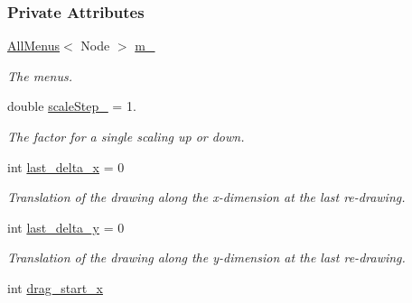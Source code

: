 \subsubsection*{Private Attributes}
\begin{DoxyCompactItemize}
\item 
\hyperlink{structAllMenus}{All\+Menus}$<$ Node $>$ \hyperlink{structui_1_1Visualizer_a13941bcce1ee1312a18bd174f7815f2f}{m\+\_\+}\hypertarget{structui_1_1Visualizer_a13941bcce1ee1312a18bd174f7815f2f}{}\label{structui_1_1Visualizer_a13941bcce1ee1312a18bd174f7815f2f}

\begin{DoxyCompactList}\small\item\em The menus. \end{DoxyCompactList}\item 
double \hyperlink{structui_1_1Visualizer_aaedb6cde16ff115fd44cdd79153405c1}{scale\+Step\+\_\+} = 1.\hypertarget{structui_1_1Visualizer_aaedb6cde16ff115fd44cdd79153405c1}{}\label{structui_1_1Visualizer_aaedb6cde16ff115fd44cdd79153405c1}

\begin{DoxyCompactList}\small\item\em The factor for a single scaling up or down. \end{DoxyCompactList}\item 
int \hyperlink{structui_1_1Visualizer_a74637d45384e77e4426d0075290788c8}{last\+\_\+delta\+\_\+x} = 0\hypertarget{structui_1_1Visualizer_a74637d45384e77e4426d0075290788c8}{}\label{structui_1_1Visualizer_a74637d45384e77e4426d0075290788c8}

\begin{DoxyCompactList}\small\item\em Translation of the drawing along the x-\/dimension at the last re-\/drawing. \end{DoxyCompactList}\item 
int \hyperlink{structui_1_1Visualizer_abd1d1f57da08d52f9da93971017df29d}{last\+\_\+delta\+\_\+y} = 0\hypertarget{structui_1_1Visualizer_abd1d1f57da08d52f9da93971017df29d}{}\label{structui_1_1Visualizer_abd1d1f57da08d52f9da93971017df29d}

\begin{DoxyCompactList}\small\item\em Translation of the drawing along the y-\/dimension at the last re-\/drawing. \end{DoxyCompactList}\item 
int \hyperlink{structui_1_1Visualizer_a17021bc087584efef77bc85824f19de7}{drag\+\_\+start\+\_\+x}\hypertarget{structui_1_1Visualizer_a17021bc087584efef77bc85824f19de7}{}\label{structui_1_1Visualizer_a17021bc087584efef77bc85824f19de7}


\end{DoxyCompactItemize}
